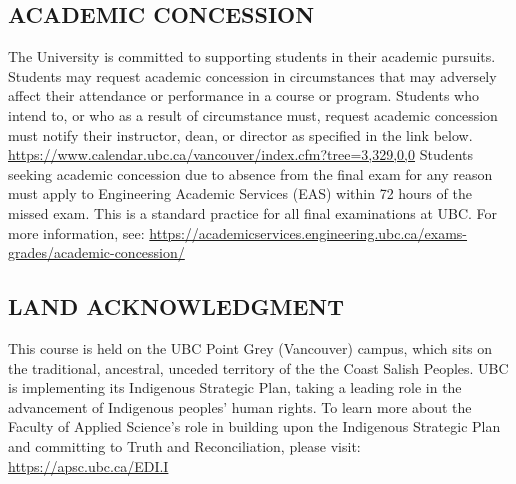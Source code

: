 \documentclass [11pt]{article}
\begin{document}
\subsection*{ACADEMIC CONCESSION}
The University is committed to supporting students in their academic pursuits. Students may request academic concession in circumstances that may adversely affect their attendance or performance in a course or program. Students who intend to, or who as a result of circumstance must, request academic concession must notify their instructor, dean, or director as specified in the link below.
\url{https://www.calendar.ubc.ca/vancouver/index.cfm?tree=3,329,0,0}
Students seeking academic concession due to absence from the final exam for any reason must apply to Engineering Academic Services (EAS) within 72 hours of the missed exam. This is a standard practice for all final examinations at UBC. For more information, see: \url{https://academicservices.engineering.ubc.ca/exams-grades/academic-concession/}

\subsection*{LAND ACKNOWLEDGMENT}
This course is held on the UBC Point Grey (Vancouver) campus, which sits on the traditional, ancestral, unceded territory of the the Coast Salish Peoples. UBC is implementing its Indigenous Strategic Plan, taking a leading role in the advancement of Indigenous peoples’ human rights. To learn more about the Faculty of Applied Science’s role in building upon the Indigenous Strategic Plan and committing to Truth and Reconciliation, please visit: \url{https://apsc.ubc.ca/EDI.I}
\end{document}
